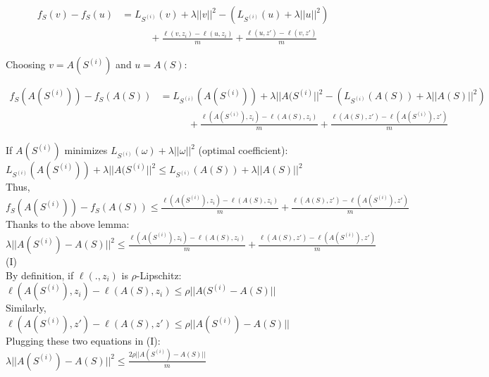 \begin{align*}
  f_S(v) - f_S(u) &= L_{S^{(i)}}(v) + \lambda || v ||^2 - (L_{S^{(i)}}(u) + \lambda || u ||^2) \\
	   &~~~~~~~~~~~~~+ \frac{\ell(v, z_i) - \ell(u, z_i)}{m} + \frac{\ell(u, z') - \ell(v, z')}{m}
\end{align*}

Choosing $v = A(S^{(i)})$ and $u = A(S)$:

\begin{align*}
  f_S(A(S^{(i)})) - f_S(A(S)) &= L_{S^{(i)}}(A(S^{(i)})) + \lambda || A(S^{(i)} ||^2 - (L_{S^{(i)}}(A(S)) + \lambda || A(S) ||^2) \\
	   &~~~~~~~~~~~~~+ \frac{\ell(A(S^{(i)}), z_i) - \ell(A(S), z_i)}{m} + \frac{\ell(A(S), z') - \ell(A(S^{(i)}), z')}{m}
\end{align*}

If $A(S^{(i)})$ minimizes $L_{S^{(i)}}(\omega) + \lambda || \omega ||^2$ (optimal coefficient): \\

$L_{S^{(i)}}(A(S^{(i)})) + \lambda || A(S^{(i)} ||^2 \leq L_{S^{(i)}}(A(S)) + \lambda || A(S) ||^2$ \\

Thus, \\

$f_S(A(S^{(i)})) - f_S(A(S)) \leq \frac{\ell(A(S^{(i)}), z_i) - \ell(A(S), z_i)}{m} + \frac{\ell(A(S), z') - \ell(A(S^{(i)}), z')}{m}$ \\

Thanks to the above lemma: \\

$ \lambda || A(S^{(i)}) - A(S) ||^2 \leq \frac{\ell(A(S^{(i)}), z_i) - \ell(A(S), z_i)}{m} + \frac{\ell(A(S), z') - \ell(A(S^{(i)}), z')}{m}$ (I) \\

By definition, if $\ell(. , z_i)$ is $\rho$-Lipschitz: \\

$\ell(A(S^{(i)}), z_i) - \ell(A(S), z_i) \leq \rho || A(S^{(i)} - A(S) ||$ \\

Similarly, \\

$\ell(A(S^{(i)}), z') - \ell(A(S), z') \leq \rho || A(S^{(i)}) - A(S) ||$ \\

Plugging these two equations in (I): \\

$\lambda || A(S^{(i)}) - A(S) ||^2 \leq \frac{2 \rho || A(S^{(i)}) - A(S) ||}{m}$ \\


